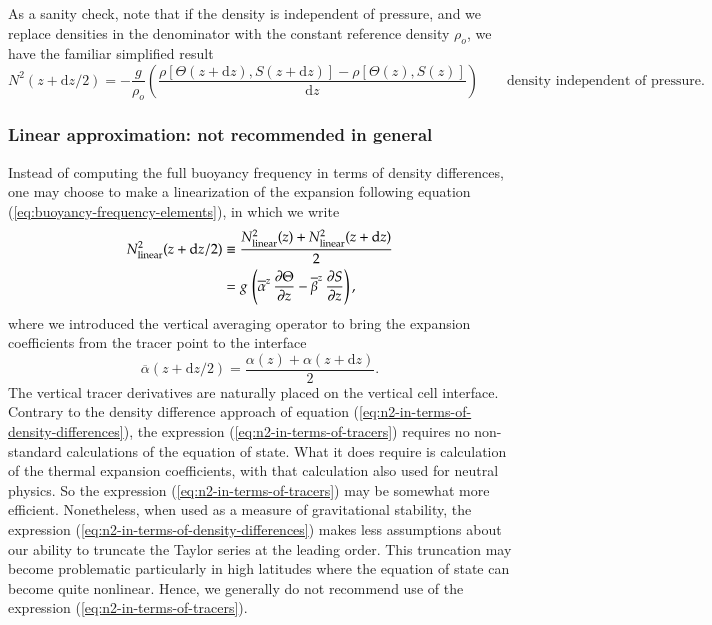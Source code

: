 \normalsize As a sanity check, note that if the density is independent
of pressure, and we replace densities in the denominator with the
constant reference density $\rho_{o}$, we have the familiar simplified
result
\begin{equation}
N^{2}(z+\mathrm{d}z/2) = -\frac{g}{\rho_{o}} 
  \left( 
 \frac{
    \rho[ \Theta(z + \mathrm{d} z), S(z + \mathrm{d} z)]
  -\rho[ \Theta(z), S(z)]
  }{\mathrm{d}z}
 \right)    \qquad   \mbox{density independent of pressure}.
\end{equation}


\subsubsection{Linear approximation: not recommended in general}

Instead of computing the full buoyancy frequency in terms of density
differences, one may choose to make a linearization of the expansion
following equation (\ref{eq:buoyancy-frequency-elements}), in which we
write
\begin{equation}
\begin{split}
N^{2}_{\mbox{\scriptsize linear}} (z+\mathrm{d}z/2) 
&\equiv \frac{N^{2}_{\mbox{\scriptsize linear}} (z) + N^{2}_{\mbox{\scriptsize linear}} (z+\mathrm{d}z)}{2}
\\
&= 
 g \, \left( \overline{\alpha}^{z}  \, \frac{\partial \Theta}{\partial z} 
               -\overline{\beta}^{z} \,  \frac{\partial S}{\partial z} \right),
\end{split}
\label{eq:n2-in-terms-of-tracers}
\end{equation} 
where we introduced the vertical averaging operator to bring the
expansion coefficients from the tracer point to the interface
\begin{equation}
  \overline{\alpha}(z+\mathrm{d}z/2) = \frac{\alpha(z) + \alpha(z+\mathrm{d}z)}{2}.
\end{equation}
The vertical tracer derivatives are naturally placed on the vertical
cell interface.  Contrary to the density difference approach of
equation (\ref{eq:n2-in-terms-of-density-differences}), the expression
(\ref{eq:n2-in-terms-of-tracers}) requires no non-standard
calculations of the equation of state.  What it does require is
calculation of the thermal expansion coefficients, with that
calculation also used for neutral physics.  So the expression
(\ref{eq:n2-in-terms-of-tracers}) may be somewhat more efficient.
Nonetheless, when used as a measure of gravitational stability, the
expression (\ref{eq:n2-in-terms-of-density-differences}) makes less
assumptions about our ability to truncate the Taylor series at the
leading order.  This truncation may become problematic particularly in
high latitudes where the equation of state can become quite nonlinear.
Hence, we generally do not recommend use of the expression
(\ref{eq:n2-in-terms-of-tracers}).


